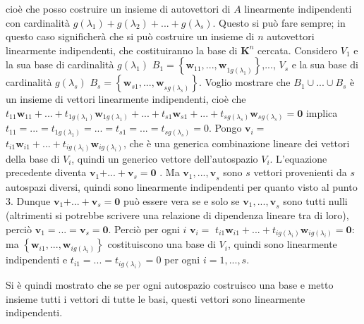 \documentclass{article}
\begin{document}
cio\`{e} che posso costruire un insieme di autovettori di $A$ linearmente
indipendenti con cardinalit\`{a} $g\left( \lambda _{1}\right) +g\left(
\lambda _{2}\right) +...+g\left( \lambda _{s}\right) $. Questo si pu\`{o}
fare sempre; in questo caso significher\`{a} che si pu\`{o} costruire un
insieme di $n$ autovettori linearmente indipendenti, che costituiranno la
base di $\mathbf{K}^{n}$ cercata. Considero $V_{1}$ e la sua base di
cardinalit\`{a} $g\left( \lambda _{1}\right) $ $B_{1}=\left\{ \mathbf{w}_{11}%
\mathbf{,...,w}_{1g\left( \lambda _{1}\right) }\right\} $,..., $V_{s}$ e la
sua base di cardinalit\`{a} $g\left( \lambda _{s}\right) $ $B_{s}=\left\{ 
\mathbf{w}_{s1}\mathbf{,...,w}_{sg\left( \lambda _{s}\right) }\right\} $.
Voglio mostrare che $B_{1}\cup ...\cup B_{s}$ \`{e} un insieme di vettori
linearmente indipendenti, cio\`{e} che $t_{11}\mathbf{w}_{11}+\mathbf{...}%
+t_{1g\left( \lambda _{1}\right) }\mathbf{w}_{1g\left( \lambda _{1}\right)
}+...+t_{s1}\mathbf{w}_{s1}+\mathbf{...}+t_{sg\left( \lambda _{s}\right) }%
\mathbf{w}_{sg\left( \lambda _{s}\right) }=\mathbf{0}$ implica $%
t_{11}=...=t_{1g\left( \lambda _{1}\right) }=...=t_{s1}=...=t_{sg\left(
\lambda _{s}\right) }=0$. Pongo $\mathbf{v}_{i}=$ $t_{i1}\mathbf{w}_{i1}+%
\mathbf{...}+t_{ig\left( \lambda _{i}\right) }\mathbf{w}_{ig\left( \lambda
_{i}\right) }$, che \`{e} una generica combinazione lineare dei vettori
della base di $V_{i}$, quindi un generico vettore dell'autospazio $V_{i}$.
L'equazione precedente diventa $\mathbf{v}_{1}\mathbf{+...+v}_{s}=\mathbf{0}$%
. Ma $\mathbf{v}_{1}\mathbf{,...,v}_{s}$ sono $s$ vettori provenienti da $s$
autospazi diversi, quindi sono linearmente indipendenti per quanto visto al
punto 3. Dunque $\mathbf{v}_{1}\mathbf{+...+v}_{s}=\mathbf{0}$ pu\`{o}
essere vera se e solo se $\mathbf{v}_{1}\mathbf{,...,v}_{s}$ sono tutti
nulli (altrimenti si potrebbe scrivere una relazione di dipendenza lineare
tra di loro), perci\`{o} $\mathbf{v}_{1}\mathbf{=...=v}_{s}\mathbf{=0}$.
Perci\`{o} per ogni $i$ $\mathbf{v}_{i}=$ $t_{i1}\mathbf{w}_{i1}+\mathbf{...}%
+t_{ig\left( \lambda _{i}\right) }\mathbf{w}_{ig\left( \lambda _{i}\right) }=%
\mathbf{0}$: ma $\left\{ \mathbf{w}_{i1},...,\mathbf{w}_{ig\left( \lambda
_{i}\right) }\right\} $ costituiscono una base di $V_{i}$, quindi sono
linearmente indipendenti e $t_{i1}\mathbf{=...}=t_{ig\left( \lambda
_{i}\right) }=0$ per ogni $i=1,...,s$.

Si \`{e} quindi mostrato che se per ogni autospazio costruisco una base e
metto insieme tutti i vettori di tutte le basi, questi vettori sono
linearmente indipendenti.
\end{document}
